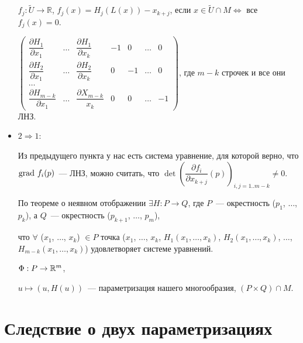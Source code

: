 \documentclass{article}
\begin{document}
\begin{itemize}
                        $f_j : \widetilde{U} \rightarrow \mathbb{R}$, $f_j(x) = H_j \left( L(x) \right) - x_{k + j}$, если $x \in \widetilde{U} \cap M \Leftrightarrow$ все $f_j(x) = 0$.
                        
                        $\begin{pmatrix} \dfrac{\partial H_1}{\partial x_1} & \ldots & \dfrac{\partial H_1}{\partial x_k} & -1 & 0 & \ldots & 0 \\ \dfrac{\partial H_2}{\partial x_1} & \ldots & \dfrac{\partial H_2}{\partial x_k} & 0 & -1 & \ldots & 0 \\ \ldots \\ \dfrac{\partial H_{m - k}}{\partial x_1} & \ldots & \dfrac{\partial X_{m - k}}{x_k} & 0 & 0 & \ldots & -1 \end{pmatrix}$, где $m - k$ строчек и все они ЛНЗ.
                        
                    \item $2 \Rightarrow 1$:
                    
                        Из предыдущего пункта у нас есть система уравнение, для которой верно, что $\grad f_i(p)$~--- ЛНЗ, можно считать, что $\det \left( \dfrac{\partial f_i}{\partial x_{k + j}} (p) \right)_{i, j = 1 .. m - k} \neq 0$.
                        
                        По теореме о неявном отображении $\exists H : P \rightarrow Q$, где $P$~--- окрестность ($p_1$, $\ldots$, $p_k$), а $Q$~--- окрестность ($p_{k + 1}$, $\ldots$, $p_m$),
                        
                        что $\forall$ ($x_1$, $\ldots$, $x_k$) $\in P$ точка ($x_1$, $\ldots$, $x_k$, $H_1(x_1, \ldots, x_k)$, $H_2(x_1, \ldots, x_k)$, $\ldots$, $H_{m - k}(x_1, \ldots, x_k)$) удовлетворяет системе уравнений.
                        
                        $\Phi : P \rightarrow \mathbb{R}^m$,
                        
                        $u \mapsto (u, H(u))$~--- параметризация нашего многообразия, $\left( P \times Q \right) \cap M$.
                        
                \end{itemize}
                
    \newpage
    
    \section{Следствие о двух параметризациях}
    
\end{document}
